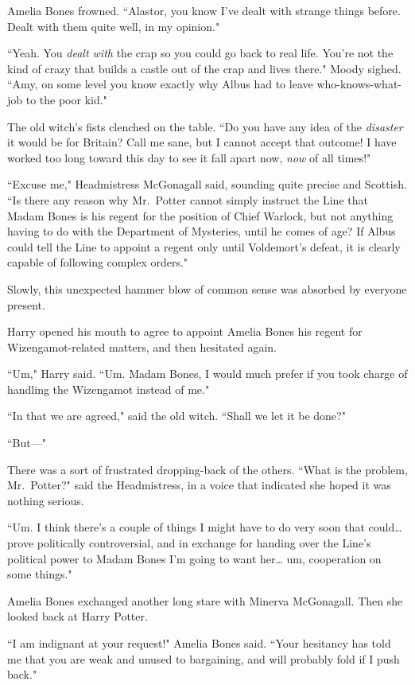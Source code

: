 Amelia Bones frowned. ``Alastor, you know I've dealt with strange things before. Dealt with them quite well, in my opinion."

``Yeah. You \emph{dealt with} the crap so you could go back to real life. You're not the kind of crazy that builds a castle out of the crap and lives there." Moody sighed. ``Amy, on some level you know exactly why Albus had to leave who-knows-what-job to the poor kid."

The old witch's fists clenched on the table. ``Do you have any idea of the \emph{disaster} it would be for Britain? Call me sane, but I cannot accept that outcome! I have worked too long toward this day to see it fall apart now, \emph{now} of all times!"

``Excuse me," Headmistress McGonagall said, sounding quite precise and Scottish. ``Is there any reason why Mr.~Potter cannot simply instruct the Line that Madam Bones is his regent for the position of Chief Warlock, but not anything having to do with the Department of Mysteries, until he comes of age? If Albus could tell the Line to appoint a regent only until Voldemort's defeat, it is clearly capable of following complex orders."

Slowly, this unexpected hammer blow of common sense was absorbed by everyone present.

Harry opened his mouth to agree to appoint Amelia Bones his regent for Wizengamot-related matters, and then hesitated again.

``Um," Harry said. ``Um. Madam Bones, I would much prefer if you took charge of handling the Wizengamot instead of me."

``In that we are agreed," said the old witch. ``Shall we let it be done?"

``But---"

There was a sort of frustrated dropping-back of the others. ``What is the problem, Mr.~Potter?" said the Headmistress, in a voice that indicated she hoped it was nothing serious.

``Um. I think there's a couple of things I might have to do very soon that could{\ldots} prove politically controversial, and in exchange for handing over the Line's political power to Madam Bones I'm going to want her{\ldots} um, cooperation on some things."

Amelia Bones exchanged another long stare with Minerva McGonagall. Then she looked back at Harry Potter.

``I am indignant at your request!" Amelia Bones said. ``Your hesitancy has told me that you are weak and unused to bargaining, and will probably fold if I push back."

